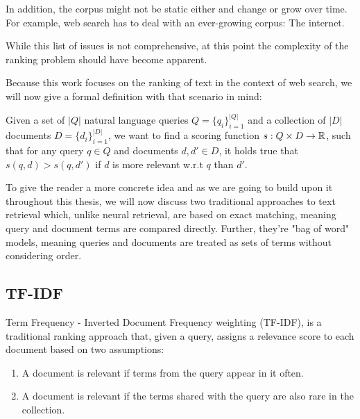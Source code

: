 In addition, the corpus might not be static either and change or grow over time. For example, web search has to deal with an ever-growing corpus: The internet.

While this list of issues is not comprehensive, at this point the complexity of the ranking problem should have become apparent.

Because this work focuses on the ranking of text in the context of web search, we will now give a formal definition with that scenario in mind:

Given a set of $|Q|$ natural language queries $Q = \{q_i\}_{i=1}^{|Q|}$ and a collection of $|D|$ documents $D = \{d_i\}_{i=1}^{|D|}$, we want to find a scoring function $s: Q \times D \rightarrow \mathbb{R}$, such that for any query $q \in Q$ and documents $d, d' \in D$, it holds true that $s(q, d) > s(q, d')$ if $d$ is more relevant w.r.t $q$ than $d'$.

To give the reader a more concrete idea and as we are going to build upon it throughout this thesis, we will now discuss two traditional approaches to text retrieval which, unlike neural retrieval, are based on exact matching, meaning query and document terms are compared directly. Further, they're "bag of word" models, meaning queries and documents are treated as sets of terms without considering order.

\subsection{TF-IDF}
Term Frequency - Inverted Document Frequency weighting (TF-IDF), is a traditional ranking approach that, given a query, assigns a relevance score to each document based on two assumptions:
\begin{enumerate}
    \item A document is relevant if terms from the query appear in it often.
    \item A document is relevant if the terms shared with the query are also rare in the collection.
\end{enumerate}

